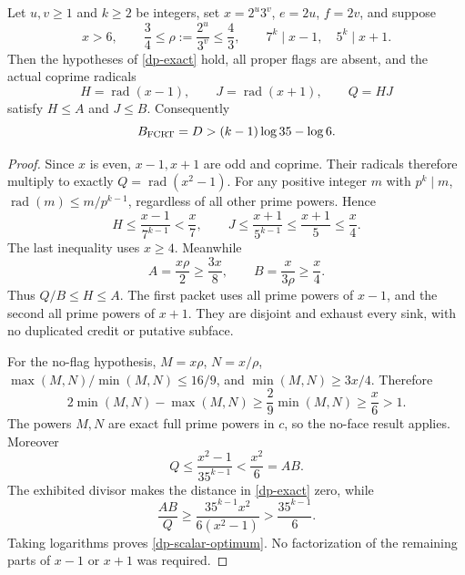 \begin{theorem}\label{dp-partition}
Let \(u,v\ge1\) and \(k\ge2\) be integers, set \(x=2^u3^v\),
\(e=2u\), \(f=2v\), and suppose
\begin{equation}\label{dp-hypotheses}
 x>6,\qquad \frac34\le\rho:=\frac{2^u}{3^v}\le\frac43,
 \qquad 7^k\mid x-1,\quad 5^k\mid x+1.
\end{equation}
Then the hypotheses of \eqref{dp-exact} hold, all proper flags are absent,
and the actual coprime radicals
\[
 H=\operatorname{rad}(x-1),\qquad
 J=\operatorname{rad}(x+1),\qquad Q=HJ
\]
satisfy \(H\le A\) and \(J\le B\). Consequently
\begin{equation}\label{dp-scalar-optimum}
 B_{\rm FCRT}=D>(k-1)\log35-\log6.
\end{equation}
\end{theorem}
\begin{proof}
Since \(x\) is even, \(x-1,x+1\) are odd and coprime. Their radicals
therefore multiply to exactly \(Q=\operatorname{rad}(x^2-1)\).
For any positive integer \(m\) with \(p^k\mid m\),
\(\operatorname{rad}(m)\le m/p^{k-1}\), regardless of all other
prime powers. Hence
\[
 H\le\frac{x-1}{7^{k-1}}<\frac{x}{7},\qquad
 J\le\frac{x+1}{5^{k-1}}\le\frac{x+1}{5}\le\frac{x}{4}.
\]
The last inequality uses \(x\ge4\). Meanwhile
\[
 A=\frac{x\rho}{2}\ge\frac{3x}{8},\qquad
 B=\frac{x}{3\rho}\ge\frac{x}{4}.
\]
Thus \(Q/B\le H\le A\). The first packet uses all prime powers of
\(x-1\), and the second all prime powers of \(x+1\). They are disjoint
and exhaust every sink, with no duplicated credit or putative subface.

For the no-flag hypothesis, \(M=x\rho\), \(N=x/\rho\),
\(\max(M,N)/\min(M,N)\le16/9\), and \(\min(M,N)\ge3x/4\).
Therefore
\[
 2\min(M,N)-\max(M,N)
 \ge\frac29\min(M,N)\ge\frac{x}{6}>1.
\]
The powers \(M,N\) are exact full prime powers in \(c\), so the
no-face result applies. Moreover
\[
 Q\le\frac{x^2-1}{35^{k-1}}<\frac{x^2}{6}=AB.
\]
The exhibited divisor makes the distance in \eqref{dp-exact} zero, while
\[
 \frac{AB}{Q}\ge
 \frac{35^{k-1}x^2}{6(x^2-1)}>\frac{35^{k-1}}6.
\]
Taking logarithms proves \eqref{dp-scalar-optimum}. No factorization
of the remaining parts of \(x-1\) or \(x+1\) was required.
\end{proof}

